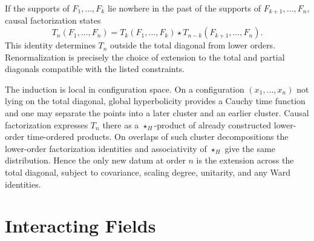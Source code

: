 If the supports of \(F_1,\ldots,F_k\) lie nowhere in the past of the supports
of \(F_{k+1},\ldots,F_n\), causal factorization states
\[
  T_n(F_1,\ldots,F_n)
  =
  T_k(F_1,\ldots,F_k)\star
  T_{n-k}(F_{k+1},\ldots,F_n).
\]
This identity determines \(T_n\) outside the total diagonal from lower orders.
Renormalization is precisely the choice of extension to the total and partial
diagonals compatible with the listed constraints.

The induction is local in configuration space.  On a configuration
\((x_1,\ldots,x_n)\) not lying on the total diagonal, global hyperbolicity
provides a Cauchy time function and one may separate the points into a later
cluster and an earlier cluster.  Causal factorization expresses \(T_n\) there
as a \(\star_H\)-product of already constructed lower-order time-ordered
products.  On overlaps of such cluster decompositions the lower-order
factorization identities and associativity of \(\star_H\) give the same
distribution.  Hence the only new datum at order \(n\) is the extension
across the total diagonal, subject to covariance, scaling degree, unitarity,
and any Ward identities.

\section{Interacting Fields}

